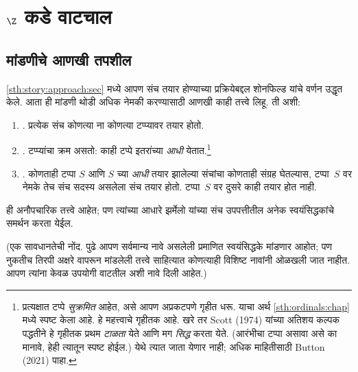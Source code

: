 \chapter{$\Z$ कडे वाटचाल}\label{sth:z:chap}




\section{मांडणीचे आणखी तपशील}\label{sth:z:story:sec}

\ref{sth:story:approach:sec} मध्ये आपण संच तयार होण्याच्या प्रक्रियेबद्दल शोनफिल्ड यांचे वर्णन उद्धृत केले. आता ही मांडणी थोडी अधिक नेमकी करण्यासाठी आणखी काही तत्त्वे लिहू. ती अशी:
\begin{enumerate}
\item[] \stageshier. प्रत्येक संच कोणत्या ना कोणत्या टप्प्यावर तयार होतो.
\item[] \stagesord. टप्प्यांचा क्रम असतो: काही टप्पे इतरांच्या \emph{आधी} येतात.\footnote{प्रत्यक्षात टप्पे \emph{सुक्रमित} आहेत, असे आपण अप्रकटपणे गृहीत धरू. याचा अर्थ \ref{sth:ordinals:chap} मध्ये स्पष्ट केला आहे. हे महत्त्वाचे गृहीतक आहे. खरे तर Scott (1974) यांच्या अतिशय कल्पक पद्धतीने हे गृहीतक प्रथम \emph{टाळता} येते आणि मग \emph{सिद्ध} करता येते. (आरंभीचा टप्पा असावा असे का मानावे, हेही त्यातून स्पष्ट होईल.) येथे त्यात जाता येणार नाही; अधिक माहितीसाठी Button (2021) पाहा.}
\item[] \stagesacc. कोणताही टप्पा $S$ आणि $S$ च्या \emph{आधी} तयार झालेल्या संचांचा कोणताही संग्रह घेतल्यास, टप्पा~$S$ वर नेमके तेच संच सदस्य असलेला संच तयार होतो. टप्पा~$S$ वर दुसरे काही तयार होत नाही.
\end{enumerate}
ही अनौपचारिक तत्त्वे आहेत; पण त्यांच्या आधारे झर्मेलो यांच्या संच उपपत्तीतील अनेक स्वयंसिद्धकांचे समर्थन करता येईल.

(एक सावधानतेची नोंद. पुढे आपण सर्वमान्य नावे असलेली प्रमाणित स्वयंसिद्धके मांडणार आहोत; पण नुकतीच तिरपी अक्षरे वापरून मांडलेली तत्त्वे साहित्यात कोणत्याही विशिष्ट नावांनी ओळखली जात नाहीत. आपण त्यांना केवळ उपयोगी वाटतील अशी नावे दिली आहेत.)








